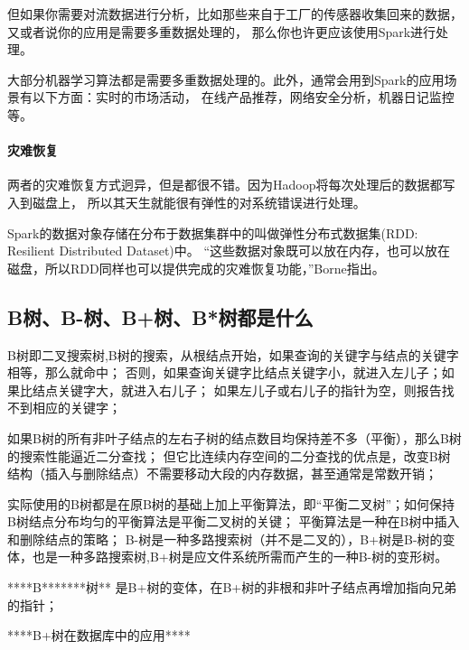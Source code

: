 \documentclass{book}
\begin{document}
但如果你需要对流数据进行分析，比如那些来自于工厂的传感器收集回来的数据，又或者说你的应用是需要多重数据处理的，
那么你也许更应该使用Spark进行处理。

大部分机器学习算法都是需要多重数据处理的。此外，通常会用到Spark的应用场景有以下方面：实时的市场活动，
在线产品推荐，网络安全分析，机器日记监控等。

\paragraph{灾难恢复}
两者的灾难恢复方式迥异，但是都很不错。因为Hadoop将每次处理后的数据都写入到磁盘上，
所以其天生就能很有弹性的对系统错误进行处理。

Spark的数据对象存储在分布于数据集群中的叫做弹性分布式数据集(RDD: Resilient Distributed Dataset)中。
“这些数据对象既可以放在内存，也可以放在磁盘，所以RDD同样也可以提供完成的灾难恢复功能，”Borne指出。

\subsection{B树、B-树、B+树、B*树都是什么}

B树即二叉搜索树,B树的搜索，从根结点开始，如果查询的关键字与结点的关键字相等，那么就命中；
否则，如果查询关键字比结点关键字小，就进入左儿子；如果比结点关键字大，就进入右儿子；
如果左儿子或右儿子的指针为空，则报告找不到相应的关键字；

如果B树的所有非叶子结点的左右子树的结点数目均保持差不多（平衡），那么B树的搜索性能逼近二分查找；
但它比连续内存空间的二分查找的优点是，改变B树结构（插入与删除结点）不需要移动大段的内存数据，甚至通常是常数开销；

实际使用的B树都是在原B树的基础上加上平衡算法，即“平衡二叉树”；如何保持B树结点分布均匀的平衡算法是平衡二叉树的关键；
平衡算法是一种在B树中插入和删除结点的策略；
B-树是一种多路搜索树（并不是二叉的），B+树是B-树的变体，也是一种多路搜索树,B+树是应文件系统所需而产生的一种B-树的变形树。

****B*******树**
是B+树的变体，在B+树的非根和非叶子结点再增加指向兄弟的指针；



****B+树在数据库中的应用****
\end{document}
